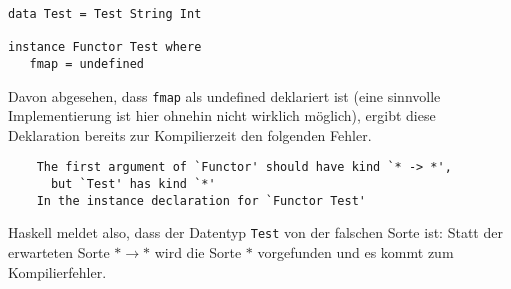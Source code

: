 \begin{verbatim}
data Test = Test String Int

instance Functor Test where
   fmap = undefined
\end{verbatim}

Davon abgesehen, dass \texttt{fmap} als undefined deklariert ist (eine sinnvolle Implementierung ist hier ohnehin nicht wirklich
möglich), ergibt diese Deklaration bereits zur Kompilierzeit den folgenden Fehler.

\begin{verbatim}
    The first argument of `Functor' should have kind `* -> *',
      but `Test' has kind `*'
    In the instance declaration for `Functor Test'
\end{verbatim}

Haskell meldet also, dass der Datentyp \texttt{Test} von der falschen Sorte ist: Statt der erwarteten Sorte $* \rightarrow *$
wird die Sorte $*$ vorgefunden und es kommt zum Kompilierfehler.

